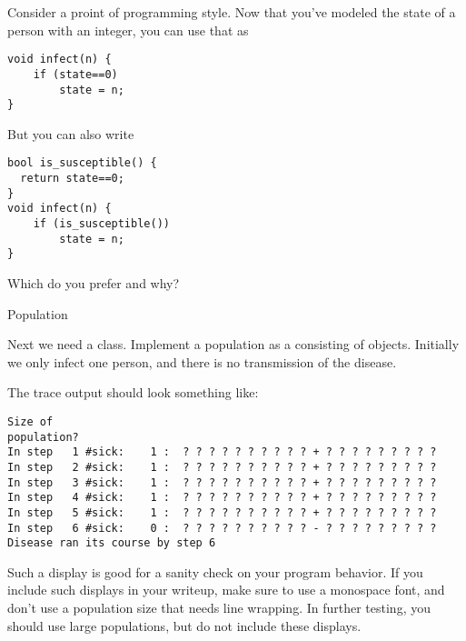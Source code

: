 \begin{remark}
  Consider a proint of programming style.
  Now that you've modeled the state of a person with an integer,
  you can use that as
\begin{lstlisting}
void infect(n) {
    if (state==0)
        state = n;
}
\end{lstlisting}
But you can also write
\begin{lstlisting}
bool is_susceptible() {
  return state==0;
}
void infect(n) {
    if (is_susceptible())
        state = n;
}
\end{lstlisting}
Which do you prefer and why?
\end{remark}

 {Population}

Next we need a  class. Implement a population as a 
consisting of  objects. Initially we only infect one person, and there
is no transmission of the disease.

The trace output should look something like:
\begin{verbatim}
Size of
population?
In step   1 #sick:    1 :  ? ? ? ? ? ? ? ? ? ? + ? ? ? ? ? ? ? ? ?
In step   2 #sick:    1 :  ? ? ? ? ? ? ? ? ? ? + ? ? ? ? ? ? ? ? ?
In step   3 #sick:    1 :  ? ? ? ? ? ? ? ? ? ? + ? ? ? ? ? ? ? ? ?
In step   4 #sick:    1 :  ? ? ? ? ? ? ? ? ? ? + ? ? ? ? ? ? ? ? ?
In step   5 #sick:    1 :  ? ? ? ? ? ? ? ? ? ? + ? ? ? ? ? ? ? ? ?
In step   6 #sick:    0 :  ? ? ? ? ? ? ? ? ? ? - ? ? ? ? ? ? ? ? ?
Disease ran its course by step 6
\end{verbatim}

\begin{remark}
  Such a display is good for a sanity check on your program behavior.
  If you include such displays
  in your writeup, make sure to use a monospace font, and don't use a population
  size that needs line wrapping. In further testing, you should use large populations,
  but do not include these displays.
\end{remark}

